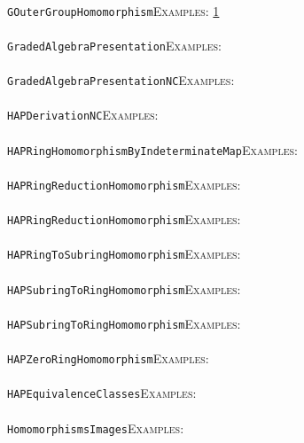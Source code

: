 \documentclass[a4paper,11pt]{report}
\begin{document}
{{ \\
 \texttt{GOuterGroupHomomorphism}{\nobreakspace}{\nobreakspace}{\nobreakspace}{\nobreakspace}\textsc{Examples:} \href{../www/SideLinks/About/aboutCoefficientSequence.html} {1}{\nobreakspace} \\
 \\
 \texttt{GradedAlgebraPresentation}{\nobreakspace}{\nobreakspace}{\nobreakspace}{\nobreakspace}\textsc{Examples:} \\
 \\
 \texttt{GradedAlgebraPresentationNC}{\nobreakspace}{\nobreakspace}{\nobreakspace}{\nobreakspace}\textsc{Examples:} \\
 \\
 \texttt{HAPDerivationNC}{\nobreakspace}{\nobreakspace}{\nobreakspace}{\nobreakspace}\textsc{Examples:} \\
 \\
 \texttt{HAPRingHomomorphismByIndeterminateMap}{\nobreakspace}{\nobreakspace}{\nobreakspace}{\nobreakspace}\textsc{Examples:} \\
 \\
 \texttt{HAPRingReductionHomomorphism}{\nobreakspace}{\nobreakspace}{\nobreakspace}{\nobreakspace}\textsc{Examples:} \\
 \\
 \texttt{HAPRingReductionHomomorphism}{\nobreakspace}{\nobreakspace}{\nobreakspace}{\nobreakspace}\textsc{Examples:} \\
 \\
 \texttt{HAPRingToSubringHomomorphism}{\nobreakspace}{\nobreakspace}{\nobreakspace}{\nobreakspace}\textsc{Examples:} \\
 \\
 \texttt{HAPSubringToRingHomomorphism}{\nobreakspace}{\nobreakspace}{\nobreakspace}{\nobreakspace}\textsc{Examples:} \\
 \\
 \texttt{HAPSubringToRingHomomorphism}{\nobreakspace}{\nobreakspace}{\nobreakspace}{\nobreakspace}\textsc{Examples:} \\
 \\
 \texttt{HAPZeroRingHomomorphism}{\nobreakspace}{\nobreakspace}{\nobreakspace}{\nobreakspace}\textsc{Examples:} \\
 \\
 \texttt{HAP{\textunderscore}EquivalenceClasses}{\nobreakspace}{\nobreakspace}{\nobreakspace}{\nobreakspace}\textsc{Examples:} \\
 \\
 \texttt{HomomorphismsImages}{\nobreakspace}{\nobreakspace}{\nobreakspace}{\nobreakspace}\textsc{Examples:} \\
}}
\end{document}
